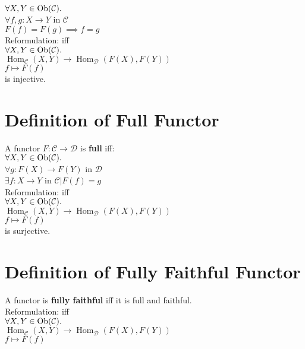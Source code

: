 \documentclass[a4paper, twoside, english, 11pt]{book}
\DeclareMathOperator{\Hom}{Hom}
\DeclareMathOperator{\Ob}{Ob}
\newcommand{\C}{\mathcal C}
\newcommand{\D}{\mathcal D}
\begin{document}
$\forall X, Y \in \Ob(\C) \ldotp$ \\
\indent
$\forall f, g : X \rightarrow Y$ in $\C$ \\
\indent
$F(f) = F(g) \implies f = g$ \\

\noindent
Reformulation: iff \\

$\forall X, Y \in \Ob(\C) \ldotp$ \\
\indent
$\Hom_\C(X, Y) \rightarrow \Hom_\D(F(X), F(Y))$ \\
\indent
$f \mapsto F(f)$ \\

\noindent
is injective.




\section{Definition of Full Functor}

A functor $F : \C \rightarrow \D$ is \textbf{full} iff: \\

$\forall X, Y \in \Ob(\C) \ldotp$ \\
\indent
$\forall g : F(X) \rightarrow F(Y)$ in $\D$ \\
\indent
$\exists f : X \rightarrow Y$ in $\C | F(f) = g$ \\

\noindent
Reformulation: iff \\

$\forall X, Y \in \Ob(\C) \ldotp$ \\
\indent
$\Hom_\C(X, Y) \rightarrow \Hom_\D(F(X), F(Y))$ \\
\indent
$f \mapsto F(f)$ \\

\noindent
is surjective.



\section{Definition of Fully Faithful Functor}

A functor is \textbf{fully faithful} iff it is full and faithful. \\

\noindent
Reformulation: iff \\

$\forall X, Y \in \Ob(\C) \ldotp$ \\
\indent
$\Hom_\C(X, Y) \rightarrow \Hom_\D(F(X), F(Y))$ \\
\indent
$f \mapsto F(f)$ \\
\end{document}
